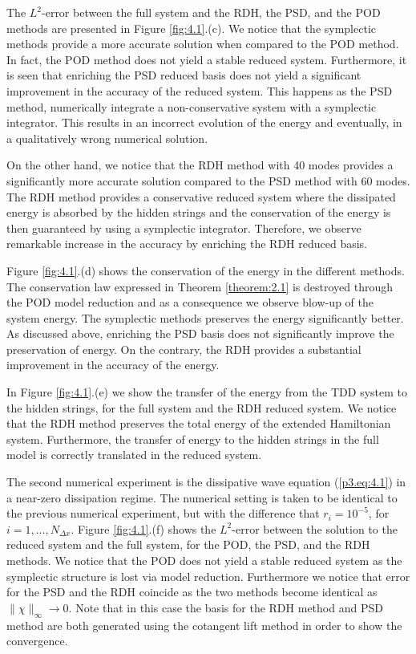 The $L^2$-error between the full system and the RDH, the PSD, and the POD methods are presented in Figure \ref{fig:4.1}.(c). We notice that the symplectic methods provide a more accurate solution when compared to the POD method. In fact, the POD method does not yield a stable reduced system.  Furthermore, it is seen that enriching the PSD reduced basis does not yield a significant improvement in the accuracy of the reduced system. This happens as the PSD method, numerically integrate a non-conservative system with a symplectic integrator. This results in an incorrect evolution of the energy and eventually, in a qualitatively wrong numerical solution.

On the other hand, we notice that the RDH method with 40 modes provides a significantly more accurate solution compared to the PSD method with 60 modes. The RDH method provides a conservative reduced system where the dissipated energy is absorbed by the hidden strings and the conservation of the energy is then guaranteed by using a symplectic integrator. Therefore, we observe remarkable increase in the accuracy by enriching the RDH reduced basis.

Figure \ref{fig:4.1}.(d) shows the conservation of the energy in the different methods. The conservation law expressed in Theorem \ref{theorem:2.1} is destroyed through the POD model reduction and as a consequence we observe blow-up of the system energy. The symplectic methods preserves the energy significantly better. As discussed above, enriching the PSD basis does not significantly improve the preservation of energy. On the contrary, the RDH provides a substantial improvement in the accuracy of the energy.

In Figure \ref{fig:4.1}.(e) we show the transfer of the energy from the TDD system to the hidden strings, for the full system and the RDH reduced system. We notice that the RDH method preserves the total energy of the extended Hamiltonian system. Furthermore, the transfer of energy to the hidden strings in the full model is correctly translated in the reduced system.



The second numerical experiment is the dissipative wave equation (\ref{p3.eq:4.1}) in a near-zero dissipation regime. The numerical setting is taken to be identical to the previous numerical experiment, but with the difference that $r_i = 10^{-5}$, for $i=1,\dots,N_{\Delta x}$. Figure \ref{fig:4.1}.(f) shows the $L^2$-error between the solution to the reduced system and the full system, for the POD, the PSD, and the RDH methods. We notice that the POD does not yield a stable reduced system as the symplectic structure is lost via model reduction. Furthermore we notice that error for the PSD and the RDH coincide as the two methods become identical as $\| \chi \|_{\infty}\to 0$. Note that in this case the basis for the RDH method and PSD method are both generated using the cotangent lift method in order to show the convergence.


